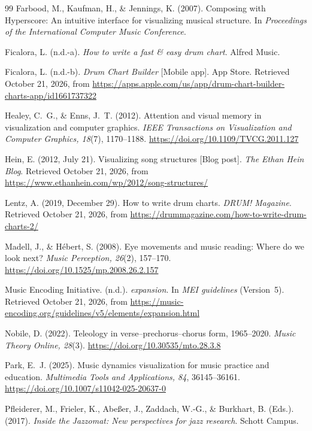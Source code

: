 \documentclass[10pt,twocolumn,a4paper]{article}
\begin{document}
\begin{thebibliography}{99}
Farbood, M., Kaufman, H., \& Jennings, K. (2007). Composing with Hyperscore: An
intuitive interface for visualizing musical structure. In \emph{Proceedings of the
International Computer Music Conference}.

Ficalora, L. (n.d.-a). \emph{How to write a fast \& easy drum chart}. Alfred Music.

Ficalora, L. (n.d.-b). \emph{Drum Chart Builder} [Mobile app]. App Store. Retrieved
October 21, 2026, from
\url{https://apps.apple.com/us/app/drum-chart-builder-charts-app/id1661737322}

Healey, C.~G., \& Enns, J.~T. (2012). Attention and visual memory in visualization
and computer graphics. \emph{IEEE Transactions on Visualization and Computer
Graphics, 18}(7), 1170--1188. \url{https://doi.org/10.1109/TVCG.2011.127}

Hein, E. (2012, July 21). Visualizing song structures [Blog post]. \emph{The Ethan
Hein Blog}. Retrieved October 21, 2026, from
\url{https://www.ethanhein.com/wp/2012/song-structures/}

Lentz, A. (2019, December 29). How to write drum charts. \emph{DRUM! Magazine}.
Retrieved October 21, 2026, from
\url{https://drummagazine.com/how-to-write-drum-charts-2/}

Madell, J., \& H\'ebert, S. (2008). Eye movements and music reading: Where do we
look next? \emph{Music Perception, 26}(2), 157--170.
\url{https://doi.org/10.1525/mp.2008.26.2.157}

Music Encoding Initiative. (n.d.). \emph{expansion}. In \emph{MEI guidelines}
(Version~5). Retrieved October 21, 2026, from
\url{https://music-encoding.org/guidelines/v5/elements/expansion.html}

Nobile, D. (2022). Teleology in verse--prechorus--chorus form, 1965--2020. \emph{Music
Theory Online, 28}(3). \url{https://doi.org/10.30535/mto.28.3.8}

Park, E.~J. (2025). Music dynamics visualization for music practice and education.
\emph{Multimedia Tools and Applications, 84}, 36145--36161.
\url{https://doi.org/10.1007/s11042-025-20637-0}

Pfleiderer, M., Frieler, K., Abe\ss er, J., Zaddach, W.-G., \& Burkhart, B. (Eds.).
(2017). \emph{Inside the Jazzomat: New perspectives for jazz research}. Schott
Campus.


\end{thebibliography}
\end{document}
